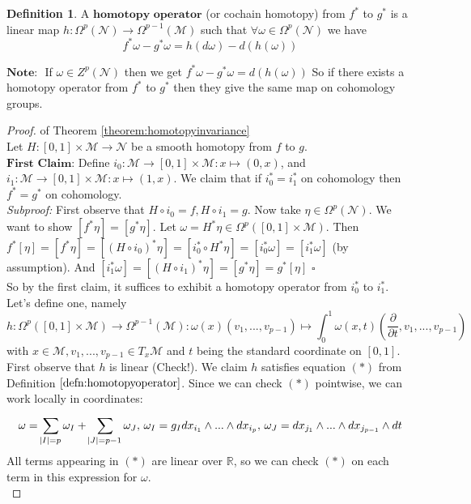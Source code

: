 \documentclass[10pt]{article}
\theoremstyle{plain}
\theoremstyle{definition}
\newtheorem{defn}[thm]{Definition} %
\newenvironment{subproof}{\textit{Subproof:}}{\hfill$\square$}
\newcommand{\Note}{\textbf{Note: }}
\newcommand{\Real}{\mathbb{R}}
\newcommand{\man}{\mathcal{M}}
\newcommand{\nan}{\mathcal{N}}
\newcommand{\allthevs}[2]{v_{#1},...,v_{#2}}
\newcommand{\allthewedge}[3]{{#1}_{#2}\wedge...\wedge{#1}_{#3}}
\newcommand{\pformman}[1]{\Omega^{#1}(\man)}
\newcommand{\pformnan}[1]{\Omega^{#1}(\nan)}
\newcommand{\dx}{dx}
\newcommand{\deriv}{d}
\newcommand{\dw}{d\omega}
\newcommand{\dt}{\deriv t}
\newcommand{\sumfromto}[2]{\sum\limits_{#1}^{#2}}
\newcommand{\coZnan}[1]{Z^{#1}(\nan)}
\newcommand{\inter}{\left[0,1\right]}
\begin{document}
\begin{defn}
\label{defn:homotopyoperator}
A $\textbf{homotopy operator}$ (or cochain homotopy) from $f^*$ to $g^*$ is a linear map $h:\pformnan{p} \to \pformman{p-1}$ such that $\forall \omega \in \pformnan{p}$ we have \begin{equation}
    f^*\omega - g^*\omega = h(\dw)-\deriv(h(\omega))\tag{$*$}
\end{equation}
\end{defn}\noindent
$\Note$ If $\omega \in \coZnan{p}$ then we get $f^*\omega - g^*\omega = \deriv(h(\omega))$
So if there exists a homotopy operator from $f^*$ to $g^*$ then they give the same map on cohomology groups.
\begin{proof}{of Theorem \ref{theorem:homotopyinvariance}}\\
Let $H:[0,1]\times \man \to \nan $ be a smooth homotopy from $f$ to  $g$.\\
$\textbf{First Claim:}$ Define $i_0 :\man \to \inter \times \man: x \mapsto (0,x)$, and $i_1 :\man \to \inter \times \man: x \mapsto (1,x)$. We claim that if $i_0^* = i_1^*$ on cohomology then $f^* = g^*$ on cohomology.\\
\begin{subproof}
First observe that $H\circ i_0 = f, H\circ i_1 = g$. Now take $\eta \in \pformnan{p}$. We want to show $[f^*\eta ] = [g^*\eta]$. Let $\omega = H^* \eta \in \Omega^p(\inter \times \man). $ Then $f^*[\eta] = [f^*\eta] = [(H\circ i_0)^*\eta] = [i_0^* \circ H^* \eta ] = [i_0^* \omega] = [i_1^*\omega ]$ (by assumption). And $[i^*_1\omega] = [(H\circ i_1)^* \eta] = [g^*\eta] =g^*[\eta]$
\end{subproof}\\
So by the first claim, it suffices to exhibit a homotopy operator from $i^*_0$ to $i_1^*$. Let's define one, namely $$h:\Omega^p(\inter\times\man) \to \pformman{p-1}: \omega(x)(v_1,...,v_{p-1}) \mapsto \int_0^1 \omega(x,t) \left(\frac{\partial}{\partial t}, v_1,...,v_{p-1}\right)$$ with $x\in \man, \allthevs{1}{p-1}\in T_x \man$ and $t$ being the standard coordinate on $\inter$. First observe that $h$ is linear (Check!). We claim $h$ satisfies equation $(*)$ from Definition $\ref{defn:homotopyoperator}$. Since we can check $(*)$ pointwise, we can work locally in coordinates: $$\omega = \sumfromto{\abs{I} = p}{} \omega _I + \sumfromto{\abs{J} = p-1}{} \omega _J,\, \omega_I = g_I \allthewedge{\dx}{i_1}{i_p}, \, \omega_J = \allthewedge{\dx}{j_1}{j_{p-1}}\wedge \dt$$
All terms appearing in $(*)$ are linear over $\Real$, so we can check $(*)$ on each term in this expression for $\omega$.\\

\end{proof}
\end{document}
